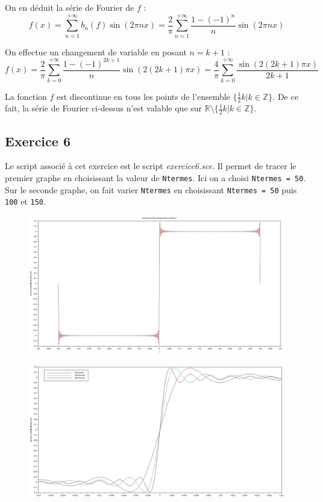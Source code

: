 \documentclass[a4paper,11pt]{article}
\begin{document}
	On en déduit la série de Fourier de $f$ :
	\begin{equation*}
		f(x) = \sum_{n=1}^{+ \infty} b_{n}(f) \sin (2 \pi n x) = \frac{2}{\pi} \sum_{n=1}^{+ \infty} \frac{1-(-1)^{n}}{n} \sin (2 \pi n x)
	\end{equation*}

	On effectue un changement de variable en posant $n=k+1$ :
	\begin{equation*}
		f(x) =  \frac{2}{\pi} \sum_{k=0}^{+ \infty} \frac{1-(-1)^{2k+1}}{n} \sin (2 (2k+1) \pi x)
		= \frac{4}{\pi} \sum_{k=0}^{+ \infty} \frac{\sin (2 (2k+1) \pi x)}{2k+1}
	\end{equation*}
	
	La fonction $f$ est discontinue en tous les points de l'ensemble $\{\frac{1}{2} k | k \in \mathbb{Z}\}$. De ce fait, la série de Fourier ci-dessus n'est valable que sur $\mathbb{R} \setminus \{\frac{1}{2} k | k \in \mathbb{Z}\}$.

\subsection*{Exercice 6}
	Le script associé à cet exercice est le script \textit{exercice6.sce}. Il permet de tracer le premier graphe en choisissant la valeur de {\tt Ntermes}. Ici on a choisi {\tt Ntermes = 50}. Sur le seconde graphe, on fait varier {\tt Ntermes} en choisissant {\tt Ntermes = 50} puis {\tt 100} et {\tt 150}.
	
\begin{figure}[H]
	\centering
	\includegraphics[width=400pt]{graphes/exercice6-1.jpg}	
\end{figure}
\begin{figure}[H]
	\centering
	\includegraphics[width=400pt]{graphes/exercice6-2.jpg}	
\end{figure}
\end{document}
